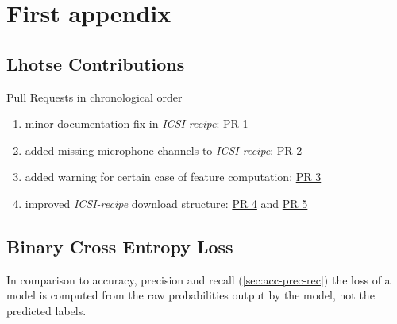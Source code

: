 \documentclass[bsc,frontabs,parskip,deptreport]{infthesis}
\begin{document}







\appendix
\chapter{First appendix}

\section{Lhotse Contributions} \label{app:lhotse-contrib}
Pull Requests in chronological order 
\begin{enumerate}
    \item minor documentation fix in \textit{ICSI-recipe}: \href{https://github.com/lhotse-speech/lhotse/pull/544}{PR 1}
    \item added missing microphone channels to \textit{ICSI-recipe}: \href{https://github.com/lhotse-speech/lhotse/pull/555}{PR 2}
    \item added warning for certain case of feature computation: \href{https://github.com/lhotse-speech/lhotse/pull/561}{PR 3}
    \item improved \textit{ICSI-recipe} download structure: \href{https://github.com/lhotse-speech/lhotse/pull/583}{PR 4} and \href{https://github.com/lhotse-speech/lhotse/pull/592}{PR 5}
\end{enumerate}

\section{Binary Cross Entropy Loss} \label{sec:cross-entropy-loss}
In comparison to accuracy, precision and recall (\autoref{sec:acc-prec-rec}) the loss of a model is computed from the raw probabilities output by the model, not the predicted labels.
\end{document}
